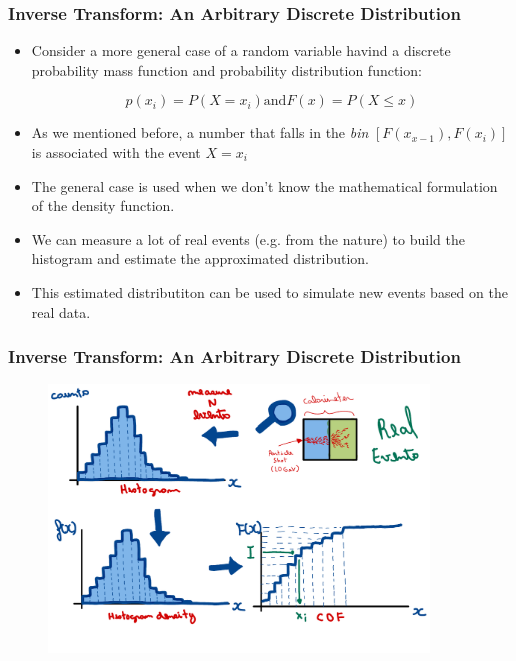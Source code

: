 \begin{frame}
    \frametitle{Inverse Transform: An Arbitrary Discrete Distribution}
    \begin{itemize}

        \item Consider a more general case of a random variable havind a discrete probability mass
        function and probability distribution function:

        $$p(x_i) = P(X=x_i) \text{and} F(x) = P(X\leq x)$$

        \item As we mentioned before, a number that falls in the \textit{bin} $[F(x_{x-1}), F(x_i)]$
        is associated with the event $X=x_i$

        \item The general case is used when we don't know the mathematical formulation of the density function.

        \item We can measure a lot of real events (e.g. from the nature) to build the histogram 
        and estimate the approximated distribution.

        \item This estimated distributiton can be used to simulate new events based on the real data.
    \end{itemize}

\end{frame}



\begin{frame}
    \frametitle{Inverse Transform: An Arbitrary Discrete Distribution}
    \begin{figure}
        \centering
        \includegraphics[width=0.9\textwidth]{sections/prng/figures/real_to_sim.pdf}
    \end{figure}
\end{frame}

